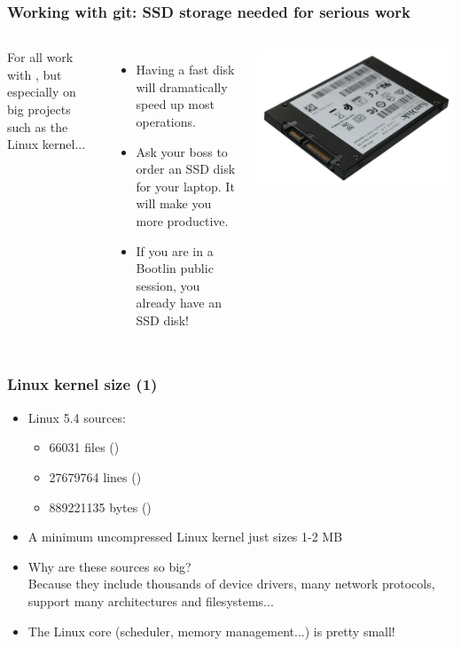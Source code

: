 \begin{frame}
  \frametitle{Working with git: SSD storage needed for serious work}
  \begin{columns}
  For all work with , but especially on big projects such as
  the Linux kernel...
  \begin{itemize}
  \item Having a fast disk will dramatically speed up most 
    operations.
  \item Ask your boss to order an SSD disk for your laptop. It will make
    you more productive.
  \item If you are in a Bootlin public session, you already have an
    SSD disk!
  \end{itemize}
  \includegraphics[width=\textwidth]{slides/sysdev-linux-intro-sources/sandisk-ssd-back.jpg}
  \end{columns}
\end{frame}


\begin{frame}
  \frametitle{Linux kernel size (1)}
  \begin{itemize}
  \item Linux 5.4 sources:\\
    \begin{itemize}
	\item 66031 files ()
	\item 27679764 lines ()
	\item 889221135 bytes ()
    \end{itemize}
  \item A minimum uncompressed Linux kernel just sizes 1-2 MB
  \item Why are these sources so big?\\
    Because they include thousands of device drivers, many network
    protocols, support many architectures and filesystems...
  \item The Linux core (scheduler, memory management...) is pretty
    small!
  \end{itemize}
\end{frame}

